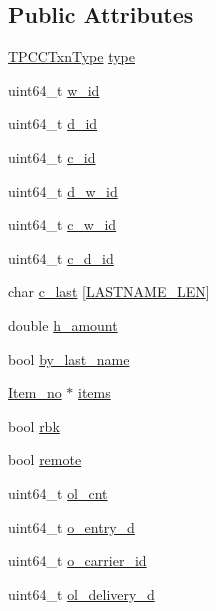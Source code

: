 \subsection*{Public Attributes}
\begin{DoxyCompactItemize}
\item 
\hyperlink{config_8h_acfc6509f2c72fc43d7232487bc453a46}{T\+P\+C\+C\+Txn\+Type} \hyperlink{classtpcc__query_a5f12b36e59fbe8ec727e77e83ae19bd4}{type}
\item 
uint64\+\_\+t \hyperlink{classtpcc__query_aa0e97757f059338ccc7a278cae867e2d}{w\+\_\+id}
\item 
uint64\+\_\+t \hyperlink{classtpcc__query_a254d50cecab220d82a74a282abec3f3d}{d\+\_\+id}
\item 
uint64\+\_\+t \hyperlink{classtpcc__query_a3cb48fdc1b1faaff64dc8b5dc576f50a}{c\+\_\+id}
\item 
uint64\+\_\+t \hyperlink{classtpcc__query_af05185ea4640fbfc367f0846e1f145b4}{d\+\_\+w\+\_\+id}
\item 
uint64\+\_\+t \hyperlink{classtpcc__query_afabc5c9e1604caed59b8713c4b2a3b34}{c\+\_\+w\+\_\+id}
\item 
uint64\+\_\+t \hyperlink{classtpcc__query_af26e6d81660517546818abd296387cd7}{c\+\_\+d\+\_\+id}
\item 
char \hyperlink{classtpcc__query_af6b70107d2c362c471d980771bbdef27}{c\+\_\+last} \mbox{[}\hyperlink{config_8h_a90a3f68e410c7182d5c26db1c17c2eab}{L\+A\+S\+T\+N\+A\+M\+E\+\_\+\+L\+EN}\mbox{]}
\item 
double \hyperlink{classtpcc__query_a5d7a89975143b15fc470d062caca5678}{h\+\_\+amount}
\item 
bool \hyperlink{classtpcc__query_a77bad57f4a3e32c56005d9217bc165fc}{by\+\_\+last\+\_\+name}
\item 
\hyperlink{structItem__no}{Item\+\_\+no} $\ast$ \hyperlink{classtpcc__query_a74760639405ccface91b0152ef8ee9ed}{items}
\item 
bool \hyperlink{classtpcc__query_a5470a0ad8319e3ddc23cc2af0f8e2b89}{rbk}
\item 
bool \hyperlink{classtpcc__query_a607efc09bb9d8423e09b1cc6c800c430}{remote}
\item 
uint64\+\_\+t \hyperlink{classtpcc__query_af6681ad2750c95c18910a366f9916a8a}{ol\+\_\+cnt}
\item 
uint64\+\_\+t \hyperlink{classtpcc__query_a009003100b68f326f524599d2ed4b57a}{o\+\_\+entry\+\_\+d}
\item 
uint64\+\_\+t \hyperlink{classtpcc__query_ae63ae62b041515410fa64024f200da66}{o\+\_\+carrier\+\_\+id}
\item 
uint64\+\_\+t \hyperlink{classtpcc__query_ab503c6d1ac454b13c2e7a643359b982d}{ol\+\_\+delivery\+\_\+d}
\end{DoxyCompactItemize}


